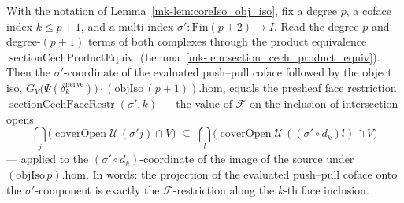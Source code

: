 \begin{lemma}
  \label{mk-lem:coreIso_comm_leg}

  With the notation of Lemma~\ref{mk-lem:coreIso_obj_iso}, fix a degree \(p\), a coface index
  \(k \le p+1\), and a multi-index \(\sigma' : \mathrm{Fin}(p+2) \to I\). Read the degree-\(p\)
  and degree-\((p+1)\) terms of both complexes through the product equivalence
  \(\operatorname{sectionCechProductEquiv}\) (Lemma~\ref{mk-lem:section_cech_product_equiv}). Then
  the \(\sigma'\)-coordinate of the evaluated push--pull coface followed by the object iso,
  \(G_V\bigl(\Psi(\delta^{\mathrm{nerve}}_k)\bigr) \cdot (\mathrm{objIso}\,(p+1)).\mathrm{hom}\),
  equals the presheaf face restriction \(\operatorname{sectionCechFaceRestr}(\sigma', k)\) — the
  value of \(\mathcal{F}\) on the inclusion of intersection opens
  \[
    \bigcap_{j}\bigl(\operatorname{coverOpen}\mathcal{U}\,(\sigma' j) \cap V\bigr)
      \;\subseteq\;
    \bigcap_{l}\bigl(\operatorname{coverOpen}\mathcal{U}\,((\sigma' \circ d_k) l) \cap V\bigr)
  \]
  — applied to the \((\sigma' \circ d_k)\)-coordinate of the image of the source under
  \((\mathrm{objIso}\,p).\mathrm{hom}\). In words: the projection of the evaluated push--pull
  coface onto the \(\sigma'\)-component is exactly the \(\mathcal{F}\)-restriction along the
  \(k\)-th face inclusion.
\end{lemma}
